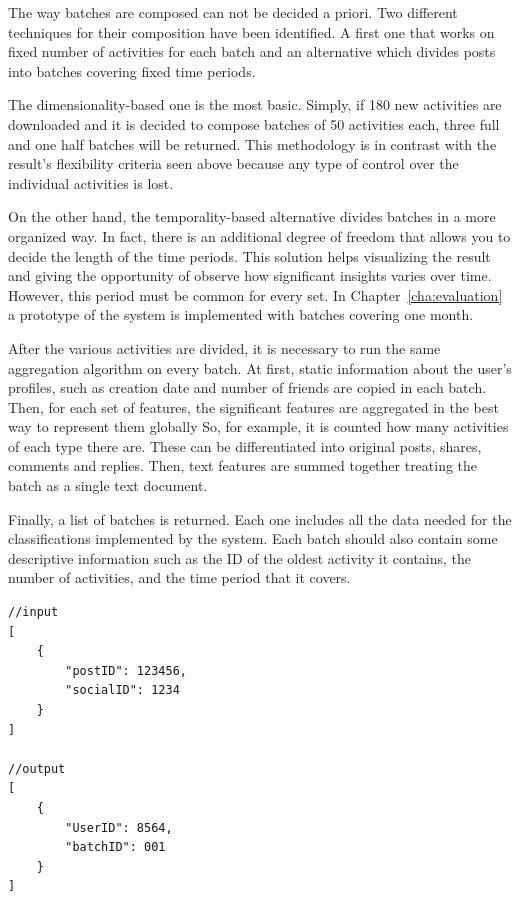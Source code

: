 The way batches are composed can not be decided a priori. Two different techniques for their composition have been identified.
A first one that works on fixed number of activities for each batch and an alternative which divides posts into batches covering fixed time periods.

The dimensionality-based one is the most basic. Simply, if 180 new activities are downloaded and it is decided to compose batches of 50 activities each, three full and one half batches will be returned.
This methodology is in contrast with the result's flexibility criteria seen above because any type of control over the individual activities is lost.

On the other hand, the temporality-based alternative divides batches in a more organized way.
In fact, there is an additional degree of freedom that allows you to decide the length of the time periods. 
This solution helps visualizing the result and giving the opportunity of observe how significant insights varies over time.
However, this period must be common for every set. In Chapter~\ref{cha:evaluation} a prototype of the system is implemented with batches covering one month.

After the various activities are divided, it is necessary to run the same aggregation algorithm on every batch.
At first, static information about the user's profiles, such as creation date and number of friends are copied in each batch.
Then, for each set of features, the significant features are aggregated in the best way to represent them globally
So, for example, it is counted how many activities of each type there are. These can be differentiated into original posts, shares, comments and replies.
Then, text features are summed together treating the batch as a single text document.

Finally, a list of batches is returned. Each one includes all the data needed for the classifications implemented by the system.
Each batch should also contain some descriptive information such as the ID of the oldest activity it contains, the number of activities, and the time period that it covers.

\begin{multicols}{2}
\begin{verbatim}
//input
[
    {
        "postID": 123456,
        "socialID": 1234
    }
]
        
//output
[
    {
        "UserID": 8564,
        "batchID": 001
    }
]
\end{verbatim}
\end{multicols}


